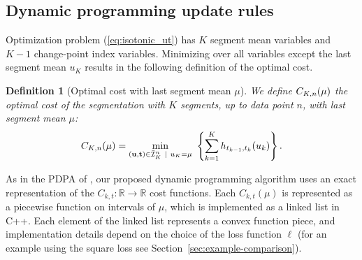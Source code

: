 \documentclass{article}
\newtheorem{definition}{Definition}
\newcommand{\RR}{\mathbb R}
\begin{document}

\subsection{Dynamic programming update rules}
\label{sec:dyn-prog}
Optimization problem (\ref{eq:isotonic_ut}) has $K$ segment mean
variables and $K-1$ change-point index variables. Minimizing over all
variables except the last segment mean $u_K$ results in the following
definition of the optimal cost.



\begin{definition}[Optimal cost with last segment mean $\mu$]
\label{def:fcc}
  We define $C_{K,n}(\mu)$ the optimal cost of the segmentation
  with $K$ segments, up to data point $n$, with last segment mean
  $\mu$:
\begin{equation}
C_{K,n}(\mu) = \min_{(\mathbf u, \mathbf t)\in\bar{\mathcal I}^n_K \ | \ u_K = \mu} \
  \left\{ \sum_{k=1}^K
  h_{t_{k-1}, t_k}(u_k) \right\}.
\end{equation}
\end{definition}

As in the PDPA of \citet{pruned-dp}, our proposed dynamic programming
algorithm uses an exact representation of the
$C_{k,t}:\RR\rightarrow\RR$ cost functions. Each $C_{k,t}(\mu)$ is
represented as a piecewise function on intervals of $\mu$, which is
implemented as a linked list in C++. Each element of the linked list
represents a convex function piece, and implementation details depend
on the choice of the loss function $\ell$ (for an example using the
square loss see Section~\ref{sec:example-comparison}).
\end{document}
